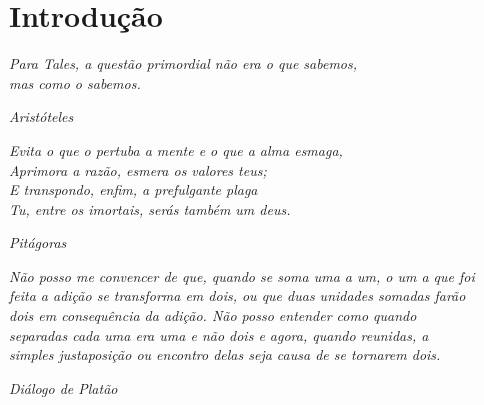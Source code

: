 
\chapter*{\textbf{\LARGE{Introdução}}}


\vspace{2cm}

\begin{center}
\textit{Para Tales, a questão primordial não era o que sabemos,\\ mas como o sabemos.}
\end{center}

\begin{flushright}
\textsl{Aristóteles}
\end{flushright}

\begin{center}
\textit{Evita o que o pertuba a mente e o que a alma esmaga,\\ Aprimora a razão, esmera os valores teus;\\ E transpondo, enfim, a prefulgante plaga\\
Tu, entre os imortais, serás também um deus.}
\end{center}

\begin{flushright}
\textsl{Pitágoras}
\end{flushright}

\begin{center}
\textit{Não posso me convencer de que, quando se soma uma a um, o um a que foi\\
feita a adição se transforma em dois, ou que duas unidades somadas farão\\ dois em consequência da adição. Não posso entender como quando\\
separadas cada uma era uma e não dois e agora, quando reunidas, a\\ simples justaposição ou encontro delas seja causa de se tornarem dois.}
\end{center}

\begin{flushright}
\textsl{Diálogo de Platão}
\end{flushright}

